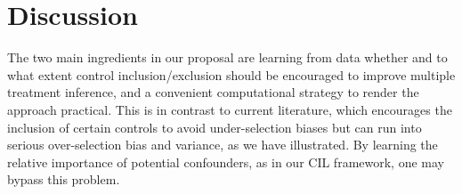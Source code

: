 \documentclass[12pt]{article}
\def\cred{\textcolor{red}}
\newcommand{\davidcom}[1]{{\color{red} [DR. #1]} }
\begin{document}



\section{Discussion} \label{sec:discuss}

The two main ingredients in our proposal are learning from data whether and to what extent control inclusion/exclusion should be encouraged to improve multiple treatment inference, and a convenient computational strategy to render the approach practical.
This is in contrast to current literature, which encourages the inclusion of certain controls to avoid under-selection biases but can run into serious over-selection bias and variance, as we have illustrated.
By learning the relative importance of potential confounders, as in our CIL framework, one may bypass this problem.
\end{document}
